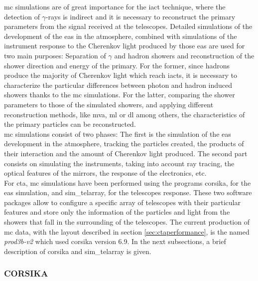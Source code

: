 \documentclass[main.tex]{subfiles}
\begin{document}
\gls{mc} simulations are of great importance for the \gls{iact} technique, where the detection of $\gamma$-rays is indirect and it is necessary to reconstruct the primary parameters from the signal received at the telescopes. Detailed simulations of the development of the \gls{eas} in the atmosphere, combined with simulations of the instrument response to the Cherenkov light produced by those \gls{eas} are used for two main purposes: Separation of $\gamma$ and hadron showers and reconstruction of the shower direction and energy of the primary. For the former, since hadrons produce the majority of Cherenkov light which reach \glspl{iact}, it is necessary to characterize the particular differences between photon and hadron induced showers thanks to the \gls{mc} simulations. For the latter, comparing the shower parameters to those of the simulated showers, and applying different  reconstruction methods, like \gls{mva}, \gls{ml} or \gls{dl} among others, the characteristics of the primary particles can be reconstructed.\\
\gls{mc} simulations consist of two phases: The first is the simulation of the \gls{eas} development in the atmosphere, tracking the particles created, the products of their interaction and the amount of Cherenkov light produced. The second part consists on simulating the instruments, taking into account ray tracing, the optical features of the mirrors, the response of the electronics, etc.\\
For \gls{cta}, \gls{mc} simulations have been performed using the programs \gls{corsika}, for the \gls{eas} simulation, and sim\_telarray, for the telescopes response. These two software packages allow to configure a specific array of telescopes with their particular features and store only the information of the particles and light from the showers that fall in the surrounding of the telescopes. The current production of \gls{mc} data, with the layout described in section \ref{sec:ctaperformance}, is the named \textit{prod3b-v2} which used \gls{corsika} version 6.9. In the next subsections, a brief description of \gls{corsika} and sim\_telarray is given.

\subsubsection{CORSIKA} \label{sec:corsika}
\end{document}
